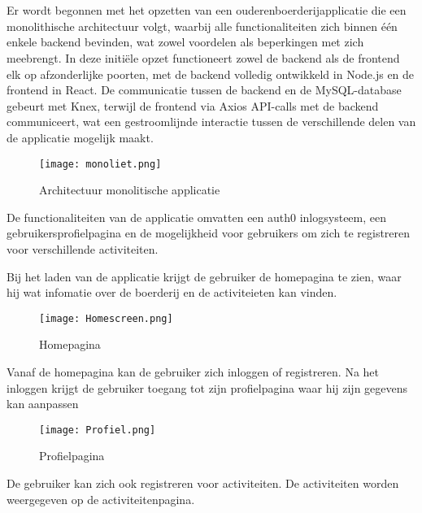 \chapter{}
\label{ch:monoliet}
Er wordt begonnen met het opzetten van een ouderenboerderijapplicatie die een monolithische architectuur volgt, waarbij alle functionaliteiten zich binnen één enkele backend bevinden, wat zowel voordelen als beperkingen met zich meebrengt. In deze initiële opzet functioneert zowel de backend als de frontend elk op afzonderlijke poorten, met de backend volledig ontwikkeld in Node.js en de frontend in React. De communicatie tussen de backend en de MySQL-database gebeurt met Knex, terwijl de frontend via Axios API-calls met de backend communiceert, wat een gestroomlijnde interactie tussen de verschillende delen van de applicatie mogelijk maakt.

\begin{figure}[H]
	\centering	
	\texttt{[image: monoliet.png]} 
	\caption{Architectuur monolitische applicatie} 
	\label{fig:monolietBP} 
\end{figure}
\FloatBarrier


De functionaliteiten van de applicatie omvatten een auth0 inlogsysteem, een gebruikersprofielpagina en de mogelijkheid voor gebruikers om zich te registreren voor verschillende activiteiten. 

Bij het laden van de applicatie krijgt de gebruiker de homepagina te zien, waar hij wat infomatie over de boerderij en de activiteieten kan vinden.

\begin{figure}[H]
    \centering	
    \texttt{[image: Homescreen.png]} 
    \caption{Homepagina} 
    \label{fig:home}
\end{figure}

Vanaf de homepagina kan de gebruiker zich inloggen of registreren. Na het inloggen krijgt de gebruiker toegang tot zijn profielpagina waar hij zijn gegevens kan aanpassen 

\begin{figure}[H]
    \centering	
    \texttt{[image: Profiel.png]} 
    \caption{Profielpagina} 
    \label{fig:profile}
\end{figure}

De gebruiker kan zich ook registreren voor activiteiten. De activiteiten worden weergegeven op de activiteitenpagina.

